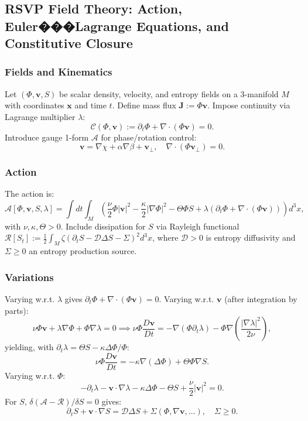 \documentclass[11pt]{article}
\theoremstyle{plain}
\theoremstyle{definition}
\begin{document}
\subsection{RSVP Field Theory: Action, Euler���Lagrange Equations, and Constitutive Closure}
\subsubsection{Fields and Kinematics}
Let $(\Phi, \bm{v}, S)$ be scalar density, velocity, and entropy fields on a 3-manifold $M$ with coordinates $\bm{x}$ and time $t$. Define mass flux $\bm{J} := \Phi \bm{v}$. Impose continuity via Lagrange multiplier $\lambda$:
\[
\mathcal{C}(\Phi, \bm{v}) := \partial_t \Phi + \nabla \cdot (\Phi \bm{v}) = 0.
\]
Introduce gauge 1-form $\mathcal{A}$ for phase/rotation control:
\[
\bm{v} = \nabla \chi + \alpha \nabla \beta + \bm{v}_\perp, \quad \nabla \cdot (\Phi \bm{v}_\perp) = 0.
\]

\subsubsection{Action}
The action is:
\[
\mathcal{A}[\Phi, \bm{v}, S, \lambda] = \int dt \int_M \left( \frac{\nu}{2} \Phi |\bm{v}|^2 - \frac{\kappa}{2} |\nabla \Phi|^2 - \Theta \Phi S + \lambda (\partial_t \Phi + \nabla \cdot (\Phi \bm{v})) \right) d^3x,
\]
with $\nu, \kappa, \Theta > 0$. Include dissipation for $S$ via Rayleigh functional $\mathcal{R}[S_t] := \frac{1}{2} \int_M \zeta (\partial_t S - \mathcal{D} \Delta S - \Sigma)^2 d^3x$, where $\mathcal{D} > 0$ is entropy diffusivity and $\Sigma \geq 0$ an entropy production source.

\subsubsection{Variations}
Varying w.r.t. $\lambda$ gives $\partial_t \Phi + \nabla \cdot (\Phi \bm{v}) = 0$.
Varying w.r.t. $\bm{v}$ (after integration by parts):
\[
\nu \Phi \bm{v} + \lambda \nabla \Phi + \Phi \nabla \lambda = 0 \implies \nu \Phi \frac{D \bm{v}}{Dt} = -\nabla (\Phi \partial_t \lambda) - \Phi \nabla \left( \frac{|\nabla \lambda|^2}{2\nu} \right),
\]
yielding, with $\partial_t \lambda = \Theta S - \kappa \Delta \Phi / \Phi$:
\[
\nu \Phi \frac{D \bm{v}}{Dt} = -\kappa \nabla (\Delta \Phi) + \Theta \Phi \nabla S.
\]
Varying w.r.t. $\Phi$:
\[
-\partial_t \lambda - \bm{v} \cdot \nabla \lambda - \kappa \Delta \Phi - \Theta S + \frac{\nu}{2} |\bm{v}|^2 = 0.
\]
For $S$, $\delta (\mathcal{A} - \mathcal{R}) / \delta S = 0$ gives:
\[
\partial_t S + \bm{v} \cdot \nabla S = \mathcal{D} \Delta S + \Sigma (\Phi, \nabla \bm{v}, \dots), \quad \Sigma \geq 0.
\]
\end{document}
